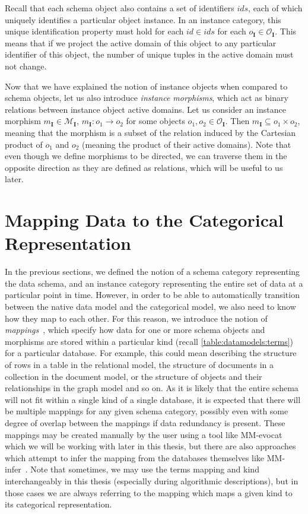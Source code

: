 Recall that each schema object also contains a set of identifiers $ids$, each of which uniquely identifies a particular object instance.
In an instance category, this unique identification property must hold for each $id \in ids$ for each $o_\mathbf{I} \in \mathcal{O}_\mathbf{I}$.
This means that if we project the active domain of this object to any particular identifier of this object, the number of unique tuples in the active domain must not change.

Now that we have explained the notion of instance objects when compared to schema objects, let us also introduce \textit{instance morphisms}, which act as binary relations between instance object active domains.
Let us consider an instance morphism $m_\mathbf{I} \in \mathcal{M}_\mathbf{I}$, $m_\mathbf{I} : o_1 \rightarrow o_2$ for some objects $o_1, o_2 \in \mathcal{O}_\mathbf{I}$.
Then $m_\mathbf{I} \subseteq o_1 \times o_2$, meaning that the morphism is a subset of the relation induced by the Cartesian product of $o_1$ and $o_2$ (meaning the product of their active domains).
Note that even though we define morphisms to be directed, we can traverse them in the opposite direction as they are defined as relations, which will be useful to us later.

\section{Mapping Data to the Categorical Representation}
\label{categorical:section:mapping}

In the previous sections, we defined the notion of a schema category representing the data schema, and an instance category representing the entire set of data at a particular point in time.
However, in order to be able to automatically transition between the native data model and the categorical model, we also need to know how they map to each other.
For this reason, we introduce the notion of \textit{mappings}~\cite{unified_representation}, which specify how data for one or more schema objects and morphisms are stored within a particular kind (recall \cref{table:datamodels:terms}) for a particular database.
For example, this could mean describing the structure of rows in a table in the relational model, the structure of documents in a collection in the document model, or the structure of objects and their relationships in the graph model and so on.
As it is likely that the entire schema will not fit within a single kind of a single database, it is expected that there will be multiple mappings for any given schema category, possibly even with some degree of overlap between the mappings if data redundancy is present.
These mappings may be created manually by the user using a tool like MM-evocat~\cite{evocat} which we will be working with later in this thesis, but there are also approaches which attempt to infer the mapping from the databases themselves like MM-infer~\cite{mm_infer}.
Note that sometimes, we may use the terms mapping and kind interchangeably in this thesis (especially during algorithmic descriptions), but in those cases we are always referring to the mapping which maps a given kind to its categorical representation.

